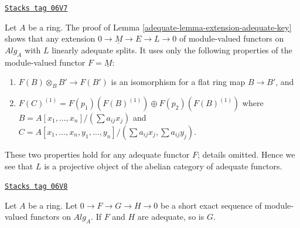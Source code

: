 \begin{remark}
\label{adequate-remark-linearly-adequate}
\href{https://stacks.math.columbia.edu/tag/06V7}{\texttt{Stacks tag 06V7}}

Let $A$ be a ring.
The proof of
Lemma \ref{adequate-lemma-extension-adequate-key}
shows that any extension $0 \to \underline{M} \to E \to L \to 0$
of module-valued functors on $\textit{Alg}_A$
with $L$ linearly adequate splits. It uses only the following properties
of the module-valued functor $F = \underline{M}$:
\begin{enumerate}
\item $F(B) \otimes_B B' \to F(B')$ is an isomorphism
for a flat ring map $B \to B'$, and
\item
$F(C)^{(1)} = F(p_1)(F(B)^{(1)}) \oplus F(p_2)(F(B)^{(1)})$
where $B = A[x_1, \ldots, x_n]/(\sum a_{ij}x_j)$ and
$C = A[x_1, \ldots, x_n, y_1, \ldots, y_n]/
(\sum a_{ij}x_j, \sum a_{ij}y_j)$.
\end{enumerate}
These two properties hold for any adequate functor $F$; details omitted.
Hence we see that $L$ is a projective object of the abelian category of
adequate functors.
\end{remark}

\begin{lemma}
\label{adequate-lemma-extension-adequate}
\href{https://stacks.math.columbia.edu/tag/06V8}{\texttt{Stacks tag 06V8}}

Let $A$ be a ring.
Let $0 \to F \to G \to H \to 0$ be a short exact sequence of
module-valued functors on $\textit{Alg}_A$.
If $F$ and $H$ are adequate, so is $G$.
\end{lemma}

